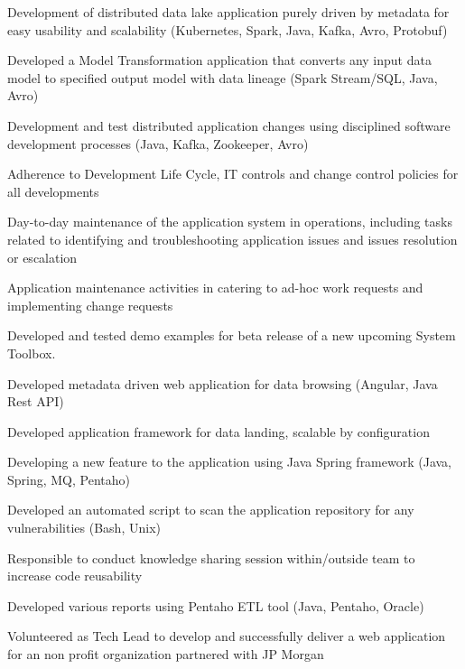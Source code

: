 \documentclass[]{main}
\begin{document}
\begin{minipage}[t]{0.73\textwidth}
\begin{tightemize}
\item Development of distributed data lake application purely driven by metadata for easy usability and scalability (Kubernetes, Spark, Java, Kafka, Avro, Protobuf)
\item Developed a Model Transformation application that converts any input data model to specified output model with data lineage (Spark Stream/SQL, Java, Avro) 
\item Development and test distributed application changes using disciplined software development processes (Java, Kafka, Zookeeper, Avro)
\item Adherence to Development Life Cycle, IT controls and change control policies for all developments
\item Day-to-day maintenance of the application system in operations, including tasks related to identifying and troubleshooting application issues and issues resolution or escalation
\item Application maintenance activities in catering to ad-hoc work requests and implementing change requests
\end{tightemize}
\sectionsep

\begin{tightemize}
\item Developed and tested demo examples for beta release of a new upcoming System Toolbox. 
\item Developed metadata driven web application for data browsing (Angular, Java Rest API)
\item Developed application framework for data landing, scalable by configuration
\item Developing a new feature to the application using Java Spring framework (Java, Spring, MQ, Pentaho)
\item Developed an automated script to scan the application repository for any vulnerabilities (Bash, Unix)
\item Responsible to conduct knowledge sharing session within/outside team to increase code reusability
\item Developed various reports using Pentaho ETL tool (Java, Pentaho, Oracle)
\item Volunteered as Tech Lead to develop and successfully deliver a web application for an non profit organization
partnered with JP Morgan
\end{tightemize}
\sectionsep

\end{minipage} 
\end{document}
